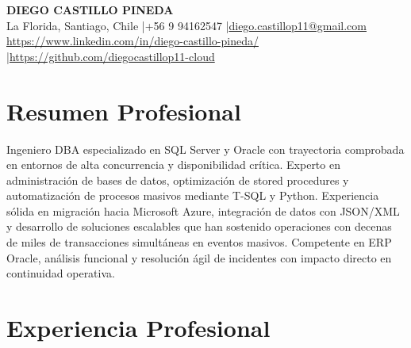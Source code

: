 \documentclass[11pt,letterpaper]{article}
\begin{document}
\begin{center}
{\fontsize{16}{19}\selectfont\textbf{\MakeUppercase{Diego Castillo Pineda}}}\\[4pt]
{\small La Florida, Santiago, Chile \quad|\quad +56 9 94162547 \quad|\quad \href{mailto:diego.castillop11@gmail.com}{diego.castillop11@gmail.com}\\
\href{https://https://www.linkedin.com/in/diego-castillo-pineda/}{https://www.linkedin.com/in/diego-castillo-pineda/} \quad|\quad \href{https://https://github.com/diegocastillop11-cloud}{https://github.com/diegocastillop11-cloud}}
\end{center}

\section{Resumen Profesional}
Ingeniero DBA especializado en SQL Server y Oracle con trayectoria comprobada en entornos de alta concurrencia y disponibilidad crítica. Experto en administración de bases de datos, optimización de stored procedures y automatización de procesos masivos mediante T-SQL y Python. Experiencia sólida en migración hacia Microsoft Azure, integración de datos con JSON/XML y desarrollo de soluciones escalables que han sostenido operaciones con decenas de miles de transacciones simultáneas en eventos masivos. Competente en ERP Oracle, análisis funcional y resolución ágil de incidentes con impacto directo en continuidad operativa.

\section{Experiencia Profesional}
\end{document}
